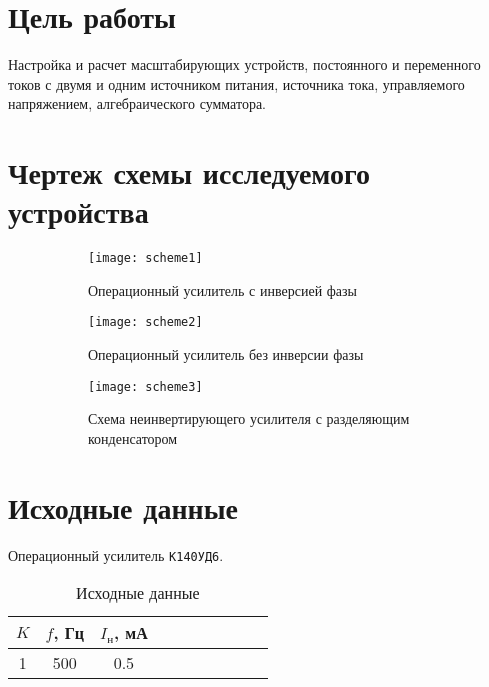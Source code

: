





\section{Цель работы}

Настройка и расчет масштабирующих устройств, постоянного и переменного токов с двумя и одним источником питания, источника тока, управляемого напряжением, алгебраического сумматора.

\section{Чертеж схемы исследуемого устройства}

\begin{figure}[H]
\begin{center}
	\begin{subfigure}[b]{0.45\textwidth}\centering
		\texttt{[image: scheme1]}
		\caption{Операционный усилитель с инверсией фазы}
	\end{subfigure}
	\begin{subfigure}[b]{0.45\textwidth}\centering
		\texttt{[image: scheme2]}
		\caption{Операционный усилитель без инверсии фазы}
	\end{subfigure}
	\begin{subfigure}[b]{0.6\textwidth}\centering
		\texttt{[image: scheme3]}
		\captionsetup{justification=centering}
		\caption{Схема неинвертирующего усилителя с разделяющим конденсатором}
	\end{subfigure}
	\caption{}
\end{center}
\end{figure}

\newpage

\section{Исходные данные}

Операционный усилитель \verb+К140УД6+.

\begin{table}[H]
\begin{center}
	\caption{Исходные данные}
	\def\tabcolsep{50pt}
	\begin{tabular}{|c|c|c|c|c|c|c|c|c|c|}
		\hline
		$K$ &
		$f$, Гц &
		$I_\text{н}$, мА \\
		\hline
		1 &
		500 &
		0.5 \\
	    \hline	
	\end{tabular}
	\label{tabular:1}
\end{center}
\end{table}

